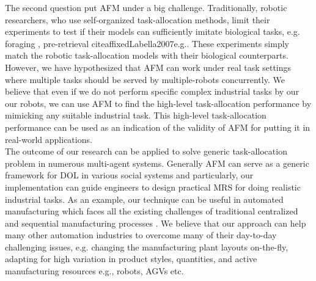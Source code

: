 The second question put AFM under a big challenge. Traditionally, robotic researchers, who use self-organized task-allocation methods, limit their experiments to test  if their models can sufficiently imitate biological tasks, e.g. foraging , pre-retrieval citeaffixed{Labella2007}{e.g.}. These experiments simply match the robotic task-allocation models with their biological counterparts. However, we have hypothesized that AFM can work under real task settings where multiple tasks  should be served by multiple-robots concurrently. We believe that even if we do not perform specific complex industrial tasks by our our robots, we can use AFM to find the high-level task-allocation performance by mimicking any suitable industrial task. This  high-level task-allocation performance can be used as an indication of the validity of AFM for putting it in real-world applications.\\
The outcome of our research can be applied to solve generic task-allocation problem in numerous multi-agent systems. Generally AFM can serve as a generic framework for DOL in various social systems and particularly, our implementation can guide engineers to design practical MRS for doing realistic industrial tasks. As an example, our technique can be useful in automated manufacturing  which faces all the existing challenges of traditional centralized and sequential manufacturing processes \cite{Shen+2006}. We believe that our approach can help many other automation industries to overcome many of their day-to-day challenging issues, e.g. changing the manufacturing plant layouts on-the-fly, adapting for high variation in product styles, quantities, and active manufacturing resources e.g., robots, AGVs etc.
% 
